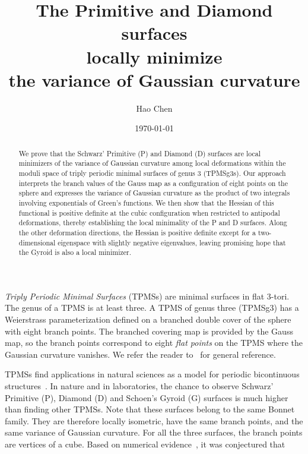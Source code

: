 \documentclass[a4paper]{amsart}
\theoremstyle{plain} %
\theoremstyle{definition} %
\theoremstyle{remark}
\begin{document}
\title[P and D locally minimize Gauss variance]
{The Primitive and Diamond surfaces\\
locally minimize\\
the variance of Gaussian curvature}

\author{Hao Chen}
\address{ShanghaiTech University, Shanghai, China}


\date{\today}

\begin{abstract}
	We prove that the Schwarz' Primitive (P) and Diamond (D) surfaces are local
	minimizers of the variance of Gaussian curvature among local deformations
	within the moduli space of triply periodic minimal surfaces of genus 3
	(TPMSg3s). Our approach interprets the branch values of the Gauss map as a
	configuration of eight points on the sphere and expresses the variance of
	Gaussian curvature as the product of two integrals involving exponentials of
	Green's functions. We then show that the Hessian of this functional is
	positive definite at the cubic configuration when restricted to antipodal
	deformations, thereby establishing the local minimality of the P and D
	surfaces.  Along the other deformation directions, the Hessian is positive
	definite except for a two-dimensional eigenspace with slightly negative
	eigenvalues, leaving promising hope that the Gyroid is also a local
	minimizer.
\end{abstract}

\maketitle

\emph{Triply Periodic Minimal Surfaces} (TPMSs) are minimal surfaces in flat
3-tori.  The genus of a TPMS is at least three.  A TPMS of genus three (TPMSg3)
has a Weierstrass parameterization defined on a branched double cover of the
sphere with eight branch points.  The branched covering map is provided by the
Gauss map, so the branch points correspond to eight \emph{flat points} on the
TPMS where the Gaussian curvature vanishes.  We refer the reader
to~\cite{meeks1990} for general reference.

TPMSs find applications in natural sciences as a model for periodic
bicontinuous structures~\cite{hyde1996}.  In nature and in laboratories, the
chance to observe Schwarz' Primitive (P), Diamond (D) and Schoen's Gyroid (G)
surfaces is much higher than finding other TPMSs.  Note that these surfaces
belong to the same Bonnet family.  They are therefore locally isometric, have
the same branch points, and the same variance of Gaussian curvature.  For all the
three surfaces, the branch points are vertices of a cube.  Based on numerical
evidence~\cite{schroderturk2006}, it was conjectured that
\end{document}
